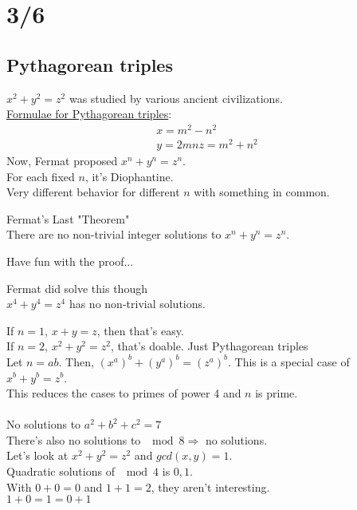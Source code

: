 \section*{3/6}
  \subsection*{Pythagorean triples}
    $x^2 + y^2 = z^2$ was studied by various ancient civilizations.\\  
    \underline{Formulae for Pythagorean triples}:
      \begin{eqnarray*}
        x = m^2 - n^2\\
        y = 2mn
        z = m^2 + n^2
      \end{eqnarray*}
    Now, Fermat proposed $x^n + y^n = z^n$.\\
    For each fixed $n$, it's Diophantine.\\
    Very different behavior for different $n$ with something in common.
    \begin{theorem}
      Fermat's Last "Theorem"\\
      There are no non-trivial integer solutions to $x^n + y^n = z^n$.
    \end{theorem}
    Have fun with the proof...
    \begin{theorem}
      Fermat did solve this though\\
      $x^4 + y^4 = z^4$ has no non-trivial solutions.
    \end{theorem}
      If $n = 1$, $x + y = z$, then that's easy.\\
      If $n = 2$, $x^2 + y^2 = z^2$, that's doable. Just Pythagorean triples\\
      Let $n = ab$. Then, $(x^a)^b + (y^a)^b = (z^a)^b$. This is a special case
      of $x^b + y^b = z^b$.\\
      This reduces the cases to primes of power 4 and $n$ is prime.\\\\
      No solutions to $a^2 + b^2 + c^2 = 7$\\
      There's also no solutions to $\mod 8 \Rightarrow$ no solutions.\\
      Let's look at $x^2 + y^2 = z^2$ and $gcd(x,y) = 1$.\\
      Quadratic solutions of $\mod 4$ is $0, 1$.\\
      With $0 + 0 = 0$ and $1 + 1 = 2$, they aren't interesting.\\
      $1 + 0 = 1 = 0 + 1$\\
